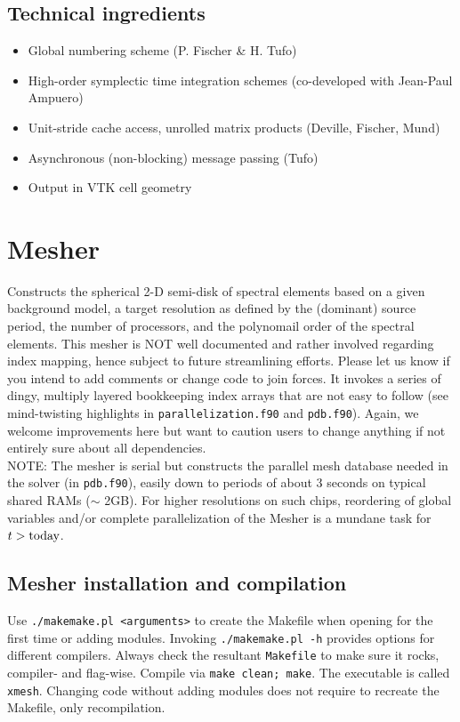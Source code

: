 \documentclass[11pt,letter,fleqn,english,notitlepage]{article}
\begin{document}
\subsection{Technical ingredients}
\begin{itemize}
\item Global numbering scheme (P. Fischer \& H. Tufo)
\item High-order symplectic time integration schemes (co-developed with Jean-Paul Ampuero)
\item Unit-stride cache access, unrolled matrix products (Deville, Fischer, Mund)
\item Asynchronous (non-blocking) message passing (Tufo)
\item Output in VTK cell geometry
\end{itemize}

\newpage
\section{Mesher}
Constructs the spherical 2-D semi-disk of spectral elements based 
on a given background model, a target resolution as defined by 
the (dominant) source period, the number of processors, 
and the polynomail order of the spectral elements. 
This mesher is NOT well documented and rather involved regarding index mapping, 
hence subject to future streamlining efforts. Please let us know if you intend to add comments or 
change code to join forces.
It invokes a series of dingy, multiply layered bookkeeping index arrays that 
are not easy to follow (see mind-twisting highlights in {\tt parallelization.f90} and {\tt pdb.f90}). 
Again, we welcome improvements here but want to caution users to change 
anything if not entirely sure about all dependencies.\\

\noindent NOTE: The mesher is serial but constructs the parallel mesh database 
needed in the solver (in {\tt pdb.f90}), easily down to periods of about 
3 seconds on typical shared RAMs ($\sim$ 2GB). 
For higher resolutions on such chips, reordering of global variables and/or complete 
parallelization of the Mesher is a mundane task for $t>{\rm today}$.

\subsection{Mesher installation and compilation}
Use {\tt ./makemake.pl <arguments>} to create the Makefile when opening for the first time or adding modules. 
Invoking {\tt ./makemake.pl -h} provides options for different compilers. Always check the resultant {\tt Makefile} to make 
sure it rocks, compiler- and flag-wise. Compile via {\tt make clean; make}. The executable is called {\tt xmesh}. 
Changing code without adding modules does not require to recreate the Makefile, only recompilation.
\end{document}
